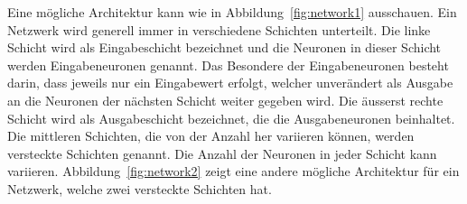 \documentclass[12pt,a4paper]{report}
\begin{document}
Eine mögliche Architektur kann wie in  Abbildung~\ref{fig:network1} ausschauen.
Ein Netzwerk wird generell immer in verschiedene Schichten unterteilt.
Die linke Schicht wird als Eingabeschicht bezeichnet und die Neuronen in dieser Schicht werden Eingabeneuronen genannt.
Das Besondere der Eingabeneuronen besteht darin, dass jeweils nur ein Eingabewert erfolgt,
welcher unverändert als Ausgabe an die Neuronen der nächsten Schicht weiter gegeben wird.
Die äusserst rechte Schicht wird als Ausgabeschicht bezeichnet, die die Ausgabeneuronen beinhaltet.
Die mittleren Schichten, die von der Anzahl her variieren können, werden versteckte Schichten genannt.
Die Anzahl der Neuronen in jeder Schicht kann variieren.
Abbildung~\ref{fig:network2} zeigt eine andere mögliche Architektur für ein Netzwerk, welche zwei versteckte
Schichten hat.
\begin{figure}[!h]
    \centering
{}
\end{figure}
\end{document}
